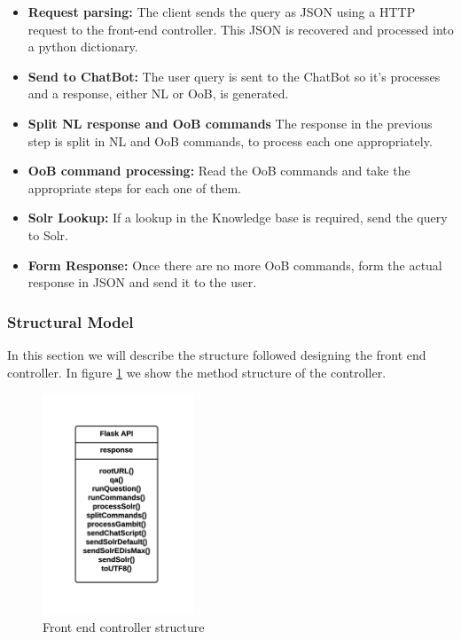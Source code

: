 \begin{itemize}
 \item \textbf{Request parsing:} The client sends the query as JSON using a HTTP request to the front-end controller. This JSON is recovered and processed into a python dictionary.
 \item \textbf{Send to ChatBot:} The user query is sent to the ChatBot so it's processes and a response, either \ac{NL} or \ac{OoB}, is generated.
 \item \textbf{Split \ac{NL} response and \ac{OoB} commands} The response in the previous step is split in \ac{NL} and {OoB} commands, to process each one appropriately.
 \item \textbf{\ac{OoB} command processing:} Read the \ac{OoB} commands and take the appropriate steps for each one of them.
 \item \textbf{Solr Lookup:} If a lookup in the Knowledge base is required, send the query to Solr.
 \item \textbf{Form Response:} Once there are no more \ac{OoB} commands, form the actual response in JSON and send it to the user.
\end{itemize}


\subsubsection{Structural Model}

In this section we will describe the structure followed designing the front end controller. In figure \ref{fig:fe-methods1} we show the method structure of the controller.
\begin{figure}[!htbp]
    \centering
    \includegraphics[width=0.4\textwidth]{img/prot/controllerStructure.png}
    \caption{Front end controller structure}
    \label{fig:fe-methods1}
\end{figure}

